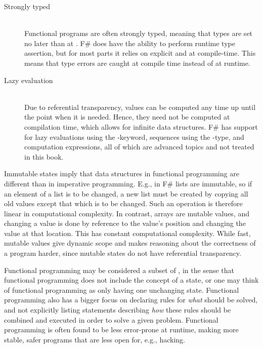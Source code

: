 \documentclass[fsharpNotes.tex]{subfiles}
\begin{document}
\begin{description}
\item[Strongly typed]~\\
Functional programs are often strongly typed, meaning that types are set no later than at . F\# does have the ability to perform runtime type assertion, but for most parts it relies on explicit  and  at compile-time. This means that type errors are caught at compile time instead of at runtime.
\item[Lazy evaluation]~\\
Due to referential transparency, values can be computed any time up until the point when it is needed. Hence, they need not be computed at compilation time, which allows for infinite data structures. F\# has support for lazy evaluations using the -keyword, sequences using the -type, and computation expressions, all of which are advanced topics and not treated in this book.
\end{description}

Immutable states imply that data structures in functional programming are different than in imperative programming. E.g., in F\# lists are immutable, so if an element of a list is to be changed, a new list must be created by copying all old values except that which is to be changed. Such an operation is therefore linear in computational complexity. In contrast, arrays are mutable values, and changing a value is done by reference to the value's position and changing the value at that location. This has constant computational complexity. While fast, mutable values give dynamic scope and makes reasoning about the correctness of a program harder, since mutable states do not have referential transparency.

Functional programming may be considered a subset of , in the sense that functional programming does not include the concept of a state, or one may think of functional programming as only having one unchanging state. Functional programming also has a bigger focus on declaring rules for \emph{what} should be solved, and not explicitly listing statements describing \emph{how} these rules should be combined and executed in order to solve a given problem. Functional programming is often found to be less error-prone at runtime, making more stable, safer programs that are less open for, e.g., hacking.
\end{document}
